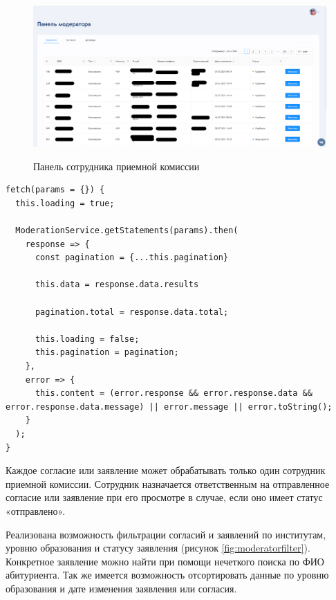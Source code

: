 \begin{figure}[H]
\begin{center}
\includegraphics[width=1\hsize]{fig/moderator.png}\\[2mm]
\caption{Панель сотрудника приемной комиссии}\label{fig:moderatorview}
\end{center}
\end{figure}

\begin{lstlisting}[caption={Метод загружающий список заявлений}, label={ls:moderatorfeath}]
fetch(params = {}) {
  this.loading = true;

  ModerationService.getStatements(params).then(
    response => {
      const pagination = {...this.pagination}

      this.data = response.data.results

      pagination.total = response.data.total;

      this.loading = false;
      this.pagination = pagination;
    },
    error => {
      this.content = (error.response && error.response.data && error.response.data.message) || error.message || error.toString();
    }
  );
}
\end{lstlisting}

Каждое согласие или заявление может обрабатывать только один сотрудник приемной комиссии. Сотрудник назначается ответственным на отправленное согласие или заявление при его просмотре в случае, если оно имеет статус «отправлено».

Реализована возможность фильтрации согласий и заявлений по институтам, уровню образования и статусу заявления (рисунок \ref{fig:moderatorfilter}). Конкретное заявление можно найти при помощи нечеткого поиска по ФИО абитуриента. Так же имеется возможность отсортировать данные по уровню образования и дате изменения заявления или согласия.

